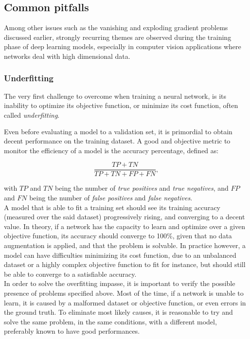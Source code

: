 \subsection{Common pitfalls}

Among other issues such as the vanishing and exploding gradient problems
discussed earlier, strongly recurring themes are observed during the training
phase of deep learning models, especially in computer vision applications where
networks deal with high dimensional data.

	\subsubsection{Underfitting}
The very first challenge to overcome when training a neural network, is its
inability to optimize its objective function, or minimize its cost function,
often called \emph{underfitting}.

Even before evaluating a model to a validation set, it is primordial to obtain
decent performance on the training dataset. A good and objective metric to
monitor the efficiency of a model is the accuracy percentage, defined as:

\begin{equation}
	\frac{TP+TN}{TP+TN+FP+FN},
\end{equation}

with $TP$ and $TN$ being the number of \emph{true positives} and \emph{true
negatives}, and $FP$ and $FN$ being the number of \emph{false positives} and
\emph{false negatives}.\\

A model that is able to fit a training set should see its training accuracy
(measured over the said dataset) progressively rising, and converging to a
decent value. In theory, if a network has the capacity to learn and optimize
over a given objective function, its accuracy should converge to 100\%, given
that no data augmentation is applied, and that the problem is solvable. In
practice however, a model can have difficulties minimizing its cost function,
due to an unbalanced dataset or a highly complex objective function to fit for
instance, but should still be able to converge to a satisfiable accuracy.\\

In order to solve the overfitting impasse, it is important to verify the
possible presence of problems specified above. Most of the time, if a network
is unable to learn, it is caused by a malformed dataset or objective function,
or even errors in the ground truth. To eliminate most likely causes, it is
reasonable to try and solve the same problem, in the same conditions, with a
different model, preferably known to have good performances.\\

